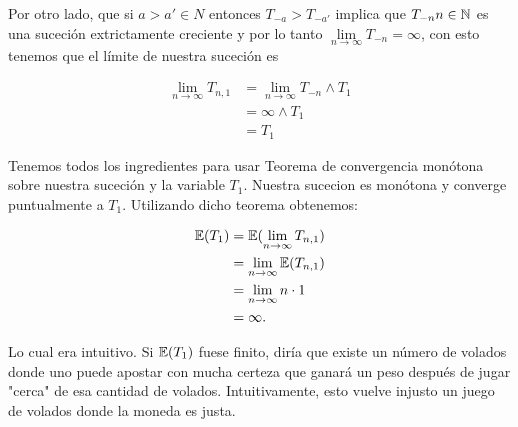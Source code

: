 	Por otro lado, que si $a>a' \in N$ entonces $T_{-a} > T_{-a'}$ implica que $T_{-n} n \in \mathbb{N}$ es 
	una suceción extrictamente creciente y por lo tanto 
	$\lim\limits_{n \rightarrow \infty} T_{-n} = \infty$, con esto tenemos que el límite de nuestra 
	suceción es 
	
    \begin{align}		
        \lim_{n\rightarrow\infty} T_{n,1}   &=  \lim_{n\rightarrow\infty} T_{-n} \wedge T_1 \\
                                            &=  \infty \wedge T_1                           \\
                                            &=  T_1
	\end{align}\par\null

	Tenemos todos los ingredientes para usar Teorema de convergencia monótona sobre nuestra suceción
	y la variable $T_1$. Nuestra sucecion es monótona y converge puntualmente a $T_1$. Utilizando
	dicho teorema obtenemos:
	
	\begin{align}
        \mathbb{E}(T_1)     &=  \mathbb{E}(\lim_{n\rightarrow\infty} T_{n,1})       \\
                    &=  \lim_{n\rightarrow\infty} \mathbb{E}(T_{n,1})       \\
                    &=  \lim_{n\rightarrow\infty} n\cdot 1          \\
                    &=  \infty.
	\end{align}\par\null
	
	Lo cual era intuitivo. Si $\mathbb{E}(T_1)$ fuese finito, diría que existe un número de volados donde
	uno puede apostar con mucha certeza que ganará un peso después de jugar "cerca" de esa cantidad
	de volados. Intuitivamente, esto vuelve injusto un juego de volados donde la moneda es
	justa.	